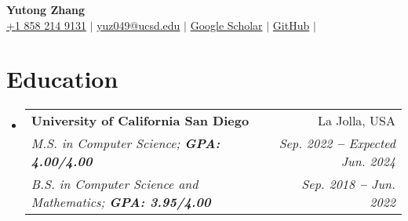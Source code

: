 \documentclass[letterpaper,11pt]{article}
\makeatletter
\newcommand{\resumeEducationHeading}[6]{
    \vspace{-2pt}\item
    \begin{tabular*}{0.97\textwidth}[t]{l@{\extracolsep{\fill}}r}
        \textbf{#1} & #2 \\
        \textit{\small #3} & \textit{\small #4} \\
        \textit{\small #5} & \textit{\small #6} \\
    \end{tabular*}\vspace{-7pt}
}
\newcommand{\resumeSubHeadingListStart}{\begin{itemize}[leftmargin=0.15in, label={}]}
\newcommand{\resumeSubHeadingListEnd}{\end{itemize}}
\makeatother
\begin{document}

\begin{center}
    \textbf{\Huge Yutong Zhang} \\ \vspace{3pt}
    \small
    \faMobile \hspace{.5pt} \href{tel:18582149131}{+1 858 214 9131}
    $|$
    \faEnvelope \hspace{.5pt} \href{mailto:yuz049@ucsd.edu}{yuz049@ucsd.edu}
    $|$
    \faGraduationCap \hspace{.5pt} \href{https://scholar.google.com/citations?user=wuaUYbYAAAAJ&hI}{Google Scholar}
    $|$
    \faGithub \hspace{.5pt} \href{https://github.com/TonyZYT2000}{GitHub}
    $|$
\end{center}




\section{Education}
    \vspace{3pt}
    \resumeSubHeadingListStart
        \resumeEducationHeading
            {University of California San Diego}
            {La Jolla, USA}
            {M.S. in Computer Science; \textbf{GPA: 4.00/4.00}}
            {Sep. 2022 \textbf{--} Expected Jun. 2024}
            {B.S. in Computer Science and Mathematics; \textbf{GPA: 3.95/4.00}}
            {Sep. 2018 \textbf{--} Jun. 2022}
    \resumeSubHeadingListEnd



\end{document}
